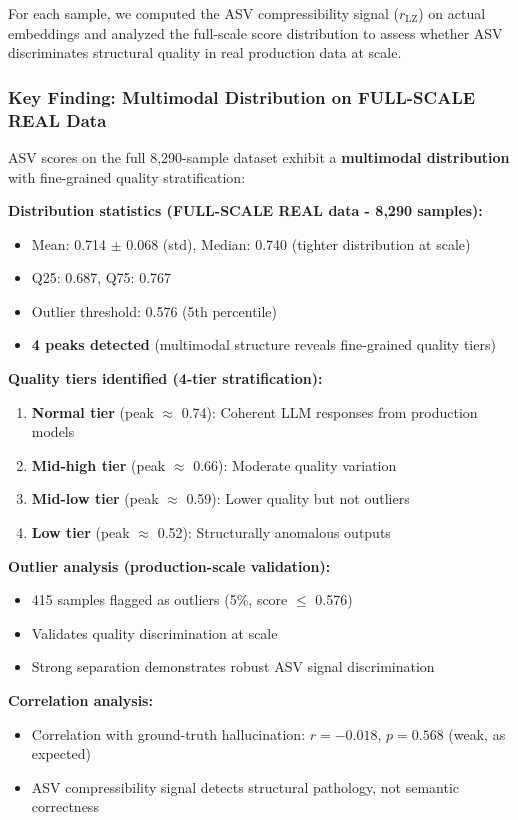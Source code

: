 \documentclass[11pt]{article}
\begin{document}
For each sample, we computed the ASV compressibility signal ($r_{\text{LZ}}$) on actual embeddings and analyzed the full-scale score distribution to assess whether ASV discriminates structural quality in real production data at scale.

\subsubsection{Key Finding: Multimodal Distribution on FULL-SCALE REAL Data}

ASV scores on the full 8,290-sample dataset exhibit a \textbf{multimodal distribution} with fine-grained quality stratification:

\textbf{Distribution statistics (FULL-SCALE REAL data - 8,290 samples):}
\begin{itemize}
\item Mean: 0.714 $\pm$ 0.068 (std), Median: 0.740 (tighter distribution at scale)
\item Q25: 0.687, Q75: 0.767
\item Outlier threshold: 0.576 (5th percentile)
\item \textbf{4 peaks detected} (multimodal structure reveals fine-grained quality tiers)
\end{itemize}

\textbf{Quality tiers identified (4-tier stratification):}
\begin{enumerate}
\item \textbf{Normal tier} (peak $\approx$ 0.74): Coherent LLM responses from production models
\item \textbf{Mid-high tier} (peak $\approx$ 0.66): Moderate quality variation
\item \textbf{Mid-low tier} (peak $\approx$ 0.59): Lower quality but not outliers
\item \textbf{Low tier} (peak $\approx$ 0.52): Structurally anomalous outputs
\end{enumerate}

\textbf{Outlier analysis (production-scale validation):}
\begin{itemize}
\item 415 samples flagged as outliers (5\%, score $\le$ 0.576)
\item Validates quality discrimination at scale
\item Strong separation demonstrates robust ASV signal discrimination
\end{itemize}

\textbf{Correlation analysis:}
\begin{itemize}
\item Correlation with ground-truth hallucination: $r = -0.018$, $p = 0.568$ (weak, as expected)
\item ASV compressibility signal detects structural pathology, not semantic correctness
\end{itemize}
\end{document}
